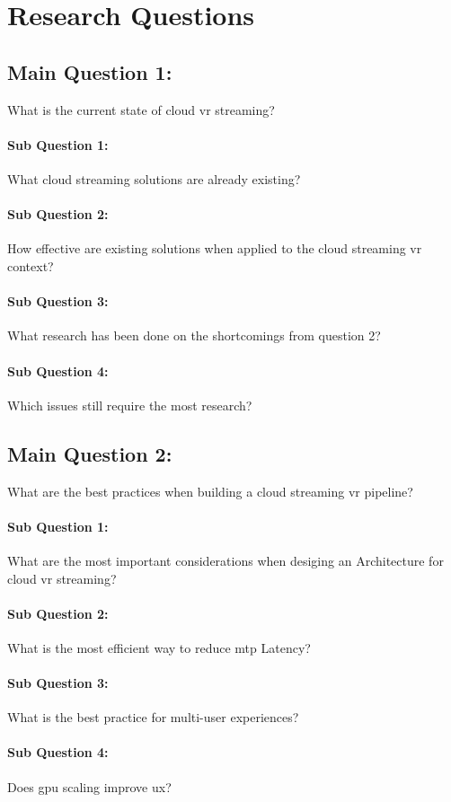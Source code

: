 \section{Research Questions}

\subsection*{Main Question 1:} What is the current state of cloud \acrfull{vr} streaming?
\paragraph{Sub Question 1:} What cloud streaming solutions are already existing?
\paragraph{Sub Question 2:} How effective are existing solutions when applied to the cloud streaming \acrshort{vr} context?
\paragraph{Sub Question 3:} What research has been done on the shortcomings from question 2?
\paragraph{Sub Question 4:} Which issues still require the most research?

\subsection*{Main Question 2:} What are the best practices when building a cloud streaming \acrshort{vr} pipeline?
\paragraph{Sub Question 1:} What are the most important considerations when desiging an Architecture for cloud \acrshort{vr} streaming?
\paragraph{Sub Question 2:} What is the most efficient way to reduce \acrfull{mtp} Latency?
\paragraph{Sub Question 3:} What is the best practice for multi-user experiences?
\paragraph{Sub Question 4:} Does \acrshort{gpu} scaling improve \acrfull{ux}?
